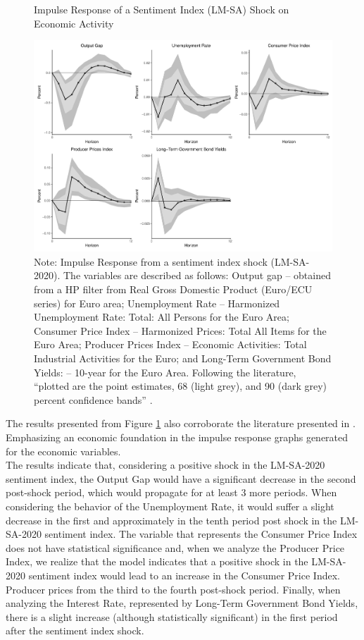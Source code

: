 \begin{figure}[!h]
    \centering
    \caption{Impulse Response of a Sentiment Index (LM-SA) Shock on Economic Activity}
    \includegraphics[width=\textwidth]{images/irf_lm.pdf}
    \caption*{Note: Impulse Response from a sentiment index shock (LM-SA-2020). The variables are described as follows: Output gap -- obtained from a HP filter from Real Gross Domestic Product (Euro/ECU series) for Euro area; Unemployment Rate -- Harmonized Unemployment Rate: Total: All Persons for the Euro Area; Consumer Price Index -- Harmonized Prices: Total All Items for the Euro Area; Producer Prices Index -- Economic Activities: Total Industrial Activities for the Euro; and Long-Term Government Bond Yields: -- 10-year for the Euro Area. Following the literature, ``plotted are the point estimates, 68 (light grey), and 90 (dark grey) percent confidence bands'' \cite[p. 40]{shapiro2020measuring}.}
    \label{fig:irflm}
\end{figure}

The results presented from Figure \ref{fig:irflm} also corroborate the literature presented in \cite{shapiro2020measuring, barsky2012information}. Emphasizing an economic foundation in the impulse response graphs generated for the economic variables.\\

The results indicate that, considering a positive shock in the LM-SA-2020 sentiment index, the Output Gap would have a significant decrease in the second post-shock period, which would propagate for at least 3 more periods. When considering the behavior of the Unemployment Rate, it would suffer a slight decrease in the first and approximately in the tenth period post shock in the LM-SA-2020 sentiment index. The variable that represents the Consumer Price Index does not have statistical significance and, when we analyze the Producer Price Index, we realize that the model indicates that a positive shock in the LM-SA-2020 sentiment index would lead to an increase in the Consumer Price Index. Producer prices from the third to the fourth post-shock period. Finally, when analyzing the Interest Rate, represented by Long-Term Government Bond Yields, there is a slight increase (although statistically significant) in the first period after the sentiment index shock.\\


